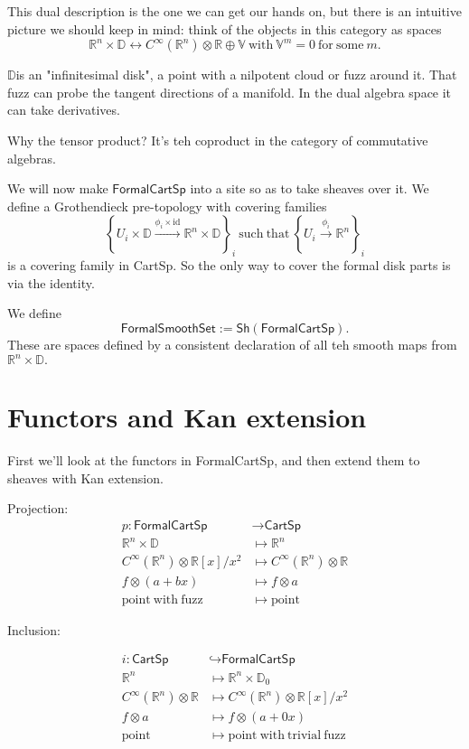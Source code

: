 \documentclass[12pt]{article}
\newcommand{\rr}{\ensuremath{\mathbb{R}}}
\newcommand{\rrn}{\ensuremath{\mathbb{R}^n}}
\newcommand{\rrx}{\ensuremath{\mathbb{R}[x]/x^2}}
\newcommand{\dd}{\ensuremath{\mathbb{D}}}
\newcommand{\cinfty}{\ensuremath{C^{\infty}}}
\newcommand{\cart}{\textsf{CartSp}}
\newcommand{\formalcart}{\textsf{FormalCartSp}}
\newcommand{\formalsmoothset}{\textsf{FormalSmoothSet}}
\newcommand{\sh}[1]{\textsf{Sh}(#1)}
\begin{document}
This dual description is the one we can get our hands on, but there is an intuitive picture we should keep in mind: think of the objects in this category as spaces $$\rr^n\times\dd\leftrightarrow\cinfty(\rr^n)\otimes\rr\oplus\mathbb{V}\mathrm{\ with\ }\mathbb{V}^m=0\mathrm{\ for\ some\ }m.$$

\dd is an "infinitesimal disk", a point with a nilpotent cloud or fuzz around it. That fuzz can probe the tangent directions of a manifold. In the dual algebra space it can take derivatives.

Why the tensor product? It's teh coproduct in the category of commutative algebras.

We will now make $\formalcart$ into a site so as to take sheaves over it. We define a Grothendieck pre-topology with covering families $$\left\{U_i\times\dd\xrightarrow[]{\phi_i\times\mathrm{id}}\rr^n\times\dd\right\}_i\mathrm{\ such\ that\ }\left\{U_i\xrightarrow[]{\phi_i}\rr^n\right\}_i$$
is a covering family in \cart. So the only way to cover the formal disk parts is via the identity.

We define $$\formalsmoothset:=\sh{\formalcart}.$$ These are spaces defined by a consistent declaration of all teh smooth maps from $\rr^n\times\dd.$

\section{Functors and Kan extension}\label{sec:functors}
First we'll look at the functors in \formalcart, and then extend them to sheaves with Kan extension.

Projection:
\begin{align*}
p:\formalcart &\to\cart \\
\rr^n\times\dd &\mapsto \rr^n \\
\cinfty(\rrn)\otimes\rrx &\mapsto \cinfty(\rrn)\otimes\rr \\
f\otimes(a+bx) &\mapsto f\otimes a \\
\mathrm{point\ with\ fuzz} &\mapsto \mathrm{point}
\end{align*}

Inclusion:

\begin{align*}
i:\cart &\hookrightarrow\formalcart \\
\rrn &\mapsto \rrn\times\dd_0 \\
\cinfty(\rrn)\otimes\rr &\mapsto\cinfty(\rrn)\otimes\rrx \\
f\otimes a &\mapsto f\otimes(a+0x) \\
\mathrm{point} &\mapsto \mathrm{point\ with\ trivial\ fuzz}
\end{align*}
\end{document}
